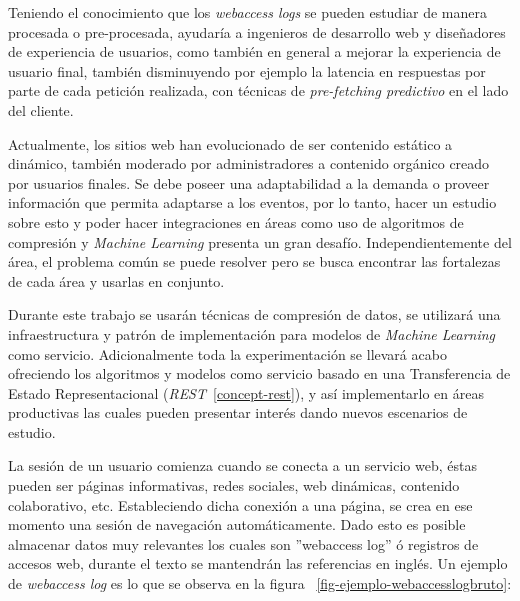   Teniendo el conocimiento que los \emph{webaccess logs} se pueden estudiar de manera procesada o pre-procesada, ayudaría a ingenieros de desarrollo web y diseñadores de experiencia de usuarios, como también en general a mejorar la experiencia de usuario final, también disminuyendo por ejemplo la latencia en respuestas por parte de cada petición realizada, con técnicas de \emph{pre-fetching predictivo} en el lado del cliente.
  

  Actualmente, los sitios web han evolucionado de ser contenido estático a dinámico, también moderado por administradores a contenido orgánico creado por usuarios finales. Se debe poseer una adaptabilidad a la demanda o proveer información que permita adaptarse a los eventos, por lo tanto, hacer un estudio sobre esto y poder hacer integraciones en áreas como uso de algoritmos de compresión y \emph{Machine Learning} presenta un gran desafío. Independientemente del área, el problema común  se puede resolver pero se busca encontrar las fortalezas de cada área y usarlas en conjunto. 

  Durante este trabajo se usarán técnicas de compresión de datos, se utilizará una infraestructura y patrón de implementación para modelos de \emph{Machine Learning} como servicio. Adicionalmente toda la experimentación se llevará acabo ofreciendo los algoritmos y modelos como servicio basado en una Transferencia de Estado Representacional (\emph{REST}~\ref{concept-rest}), y así implementarlo en áreas productivas las cuales pueden presentar interés dando nuevos escenarios de estudio.


  La sesión de un usuario comienza cuando se conecta a un servicio web, éstas pueden ser páginas informativas, redes sociales, web dinámicas, contenido colaborativo, etc. Estableciendo dicha conexión a una página, se crea en ese momento una sesión de navegación automáticamente. Dado esto es posible almacenar datos muy relevantes los cuales son ''webaccess log'' ó registros de accesos web, durante el texto se mantendrán las referencias en inglés. Un ejemplo de \emph{webaccess log} es lo que se observa en la figura ~\ref{fig-ejemplo-webaccesslogbruto}:


